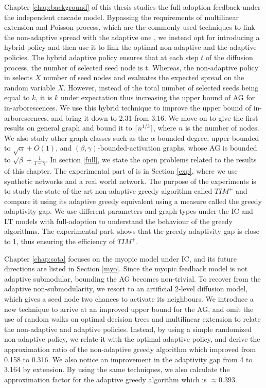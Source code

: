 Chapter \ref{chap:background} of this thesis studies the full adoption feedback under the independent cascade model. Bypassing the requirements of multilinear extension and Poisson process, which are the commonly used techniques to link the non-adaptive spread with the adaptive one \cite{Chen2019}, we instead opt for introducing a hybrid policy and then use it to link the optimal non-adaptive and the adaptive policies. The hybrid adaptive policy ensures that at each step $t$ of the diffusion process, the number of selected seed node is t. Whereas, the non-adaptive policy in \cite{Chen2019} selects $X$ number of seed nodes and evaluates the expected spread on the random variable $X$. However, instead of the total number of selected seeds being equal to $k$, it is $k$ under expectation thus increasing the upper bound of AG for in-arborescences. We use this hybrid technique to improve the upper bound of in-arborescences, and bring it down to 2.31 from 3.16. We move on to give the first results on general graph and bound it to $\lceil n^{1/3}\rceil$, where $n$ is the number of nodes. We also study other graph classes such as the $\alpha$-bounded-degree, upper bounded to $\sqrt{\alpha}+ O(1)$, and $(\beta,\gamma)$-bounded-activation graphs, whose AG is bounded to $\sqrt{\beta}+\frac{1}{1-\gamma}$. In section \ref{full}, we state the open problems related to the results of this chapter.
The experimental part of is in Section \ref{exp}, where we use synthetic networks and a real world network. The purpose of the experiments is to study the state-of-the-art non-adaptive greedy algorithm called $TIM^+$ and compare it using its adaptive greedy equivalent using a measure called the greedy adaptivity gap. We use different parameters and graph types under the IC and LT models with full-adoption to understand the behaviour of the greedy algorithms. The experimental part, shows that the greedy adaptivity gap is close to 1, thus ensuring the efficiency of $TIM^+$.


Chapter \ref{chap:sota} focuses on the myopic model under IC, and its future directions are listed in Section \ref{myo}. Since the myopic feedback model is not adaptive submodular, bounding the AG becomes non-trivial. To recover from the adaptive non-submodularity, we resort to an artificial 2-level diffusion model, which gives a seed node two chances to activate its neighbours. We introduce a new technique to arrive at an improved upper bound for the AG, and omit the use of random walks on optimal decision trees and multilinear extension to relate the non-adaptive and adaptive policies. Instead, by using a simple randomized non-adaptive policy, we relate it with the optimal adaptive policy, and derive the approximation ratio of the non-adaptive greedy algorithm which improved from 0.158 \cite{Peng2019} to 0.316. We also notice an improvement in the adaptivity gap from 4 to 3.164 by extension. By using the same techniques, we also calculate the approximation factor for the adaptive greedy algorithm which is $\approx 0.393$.







